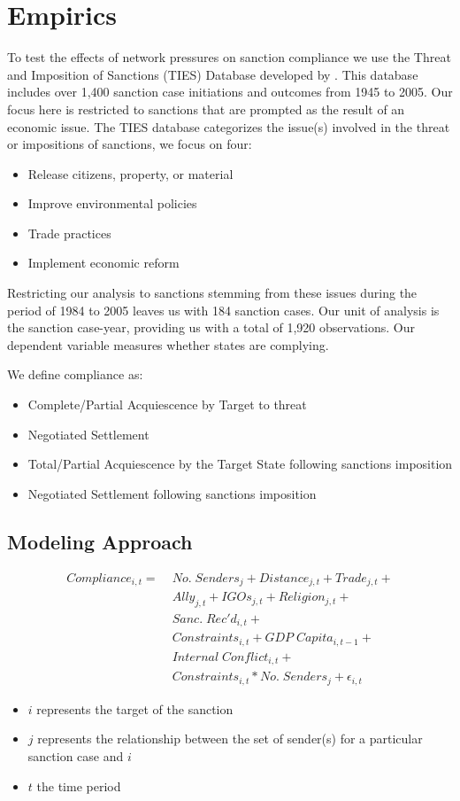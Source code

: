 \section{Empirics}
\label{empirics}

To test the effects of network pressures on sanction compliance we use the Threat and Imposition of Sanctions (TIES) Database developed by \citet{morgan2009threat}. This database includes over 1,400 sanction case initiations and outcomes from 1945 to 2005. Our focus here is restricted to sanctions that are prompted as the result of an economic issue. The TIES database categorizes the issue(s) involved in the threat or impositions of sanctions, we focus on four:

\begin{itemize}
	\item Release citizens, property, or material
	\item Improve environmental policies
	\item Trade practices
	\item Implement economic reform
\end{itemize}

Restricting our analysis to sanctions stemming from these issues during the period of 1984 to 2005 leaves us with 184 sanction cases. Our unit of analysis is the sanction case-year, providing us with a total of 1,920 observations. Our dependent variable measures whether states are complying. 


We define compliance as:
	\begin{itemize}
		\item Complete/Partial Acquiescence by Target to threat
		\item Negotiated Settlement
		\item Total/Partial Acquiescence by the Target State following sanctions imposition
		\item Negotiated Settlement following sanctions imposition
	\end{itemize}
	
\subsection{Modeling Approach} 
\begin{align*}
		Compliance_{i,t} =\; & No. \; Senders_{j} + Distance_{j,t} + Trade_{j,t}  + \\
		 &Ally_{j,t} + IGOs_{j,t} + Religion_{j,t} +\\
 		 &Sanc. \; Rec'd_{i,t} + \\
		 &Constraints_{i,t} + GDP \; Capita_{i,t-1} +\\
		 & Internal \; Conflict_{i,t} +\\
		 &Constraints_{i,t}*No. \; Senders_{j} + \epsilon_{i,t}
	\end{align*}
	
\begin{itemize}
	\item $i$ represents the target of the sanction
	\item $j$ represents the relationship between the set of sender(s) for a particular sanction case and $i$
	\item $t$ the time period
\end{itemize}
